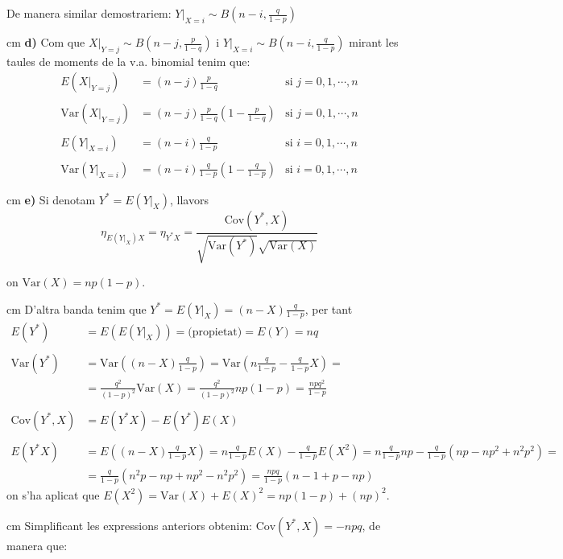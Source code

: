 \documentclass{article}
\begin{document}
\noindent
De manera similar demostrariem: $Y|_{X=i} \sim B(n-i, \frac{q}{1-p})$

 cm
\noindent
\textbf{d)} Com que $X|_{Y=j} \sim B(n-j, \frac{p}{1-q})$ i $Y|_{X=i} \sim B(n-i, \frac{q}{1-p})$ 
mirant les taules de moments de la v.a. binomial tenim que:
\[
\begin{array}{rll}
E(X|_{Y=j}) &= (n-j) \frac{p}{1-q} & \text{si } j=0, 1, \cdots, n \\ \\
\mathrm{Var}(X|_{Y=j}) &= (n-j) \frac{p}{1-q} (1-\frac{p}{1-q}) & \text{si } j=0, 1, \cdots, n \\ \\
E(Y|_{X=i}) &=(n-i) \frac{q}{1-p} & \text{si } i=0, 1, \cdots, n \\ \\
\mathrm{Var}(Y|_{X=i}) &=(n-i) \frac{q}{1-p} (1-\frac{q}{1-p}) & \text{si } i=0, 1, \cdots, n 
\end{array}
\]

 cm
\noindent
\textbf{e)} Si denotam $Y^*=E(Y|_X)$, llavors
\[
\eta_{E(Y|_X) X}=\eta_{Y^*X}=\frac{ \mathrm{Cov}(Y^*, X) }{\sqrt{\mathrm{Var}(Y^*)} \sqrt{\mathrm{Var}(X)} }
\]

\noindent
on $\mathrm{Var}(X)=np(1-p)$.

 cm
\noindent
D'altra banda tenim que $Y^*=E(Y|_X)=(n-X) \frac{q}{1-p}$, per tant
\[ 
\begin{array}{rl}
E(Y^*)& =E(E(Y|_X))=\text{(propietat)}=E(Y)=nq \\ \\
\mathrm{Var}(Y^*)& =\mathrm{Var}\left( (n-X) \frac{q}{1-p} \right)= 
\mathrm{Var}\left( n \frac{q}{1-p} - \frac{q}{1-p} X \right) = \\
 &= \frac{q^2}{(1-p)^2} \mathrm{Var}(X)=  \frac{q^2}{(1-p)^2}  np(1-p) = \frac{npq^2}{1-p} \\ \\
\mathrm{Cov}(Y^*, X) &= E(Y^*X)-E(Y^*)E(X) \\ \\
E(Y^*X) &= E \left(  (n-X) \frac{q}{1-p} X \right) =n \frac{q}{1-p} E(X) - \frac{q}{1-p} E(X^2) =
n \frac{q}{1-p}  np - \frac{q}{1-p} (np-np^2+n^2p^2) = \\ 
&= \frac{q}{1-p} ( n^2p - np+np^2-n^2p^2 )=\frac{npq}{1-p} (n-1+p-np)
\end{array}
\]
\noindent
on s'ha aplicat que $E(X^2)=\mathrm{Var}(X)+E(X)^2= np(1-p)+(np)^2$.

 cm
\noindent
Simplificant les expressions anteriors obtenim: $\mathrm{Cov}(Y^*, X) =-npq$,
de manera que:
\end{document}
